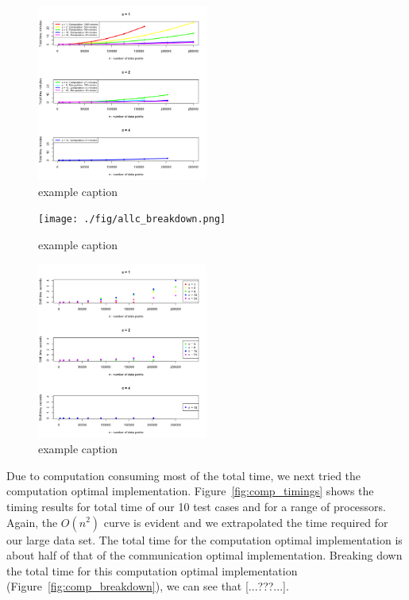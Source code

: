 \begin{figure}[!ht]
   \centering
   \includegraphics[width=0.5\textwidth]{./fig/comm_allc_timings.png} %
   \caption{example caption}
   \label{fig:comm_allc_timings}
\end{figure}

\begin{figure}[!ht]
   \centering
   \texttt{[image: ./fig/allc\_breakdown.png]} %
   \caption{example caption}
   \label{fig:allc_breakdown}
\end{figure}

\begin{figure}[!ht]
   \centering
   \includegraphics[width=0.5\textwidth]{./fig/comm_allc_comm.png} %
   \caption{example caption}
   \label{fig:comm_allc_comm}
\end{figure}

Due to computation consuming most of the total time, we next tried the computation optimal implementation. Figure~\ref{fig:comp_timings} shows the timing results for total time of our 10 test cases and for a range of processors. Again, the $O(n^2)$ curve is evident and we extrapolated the time required for our large data set. The total time for the computation optimal implementation is about half of that of the communication optimal implementation. Breaking down the total time for this computation optimal implementation (Figure~\ref{fig:comp_breakdown}), we can see that [...???...]. 

